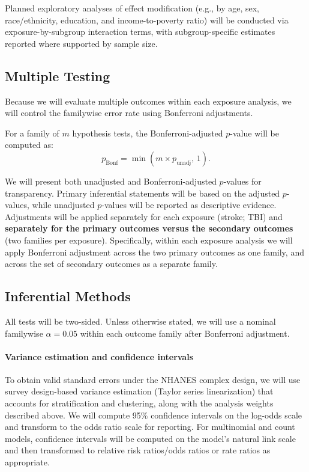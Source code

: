 \documentclass{article}
\begin{document}
Planned exploratory analyses of effect modification (e.g., by age, sex, race/ethnicity, education, and income-to-poverty ratio) will be conducted via exposure-by-subgroup interaction terms, with subgroup-specific estimates reported where supported by sample size.

\subsection{Multiple Testing}

Because we will evaluate multiple outcomes within each exposure analysis, we will control the familywise error rate using Bonferroni adjustments.

For a family of $m$ hypothesis tests, the Bonferroni-adjusted $p$-value will be computed as:
\[
p_{\text{Bonf}} = \min(m \times p_{\text{unadj}},\,1).
\]

We will present both unadjusted and Bonferroni-adjusted $p$-values for transparency. Primary inferential statements will be based on the adjusted $p$-values, while unadjusted $p$-values will be reported as descriptive evidence. Adjustments will be applied separately for each exposure (stroke; TBI) and \textbf{separately for the primary outcomes versus the secondary outcomes} (two families per exposure). Specifically, within each exposure analysis we will apply Bonferroni adjustment across the two primary outcomes as one family, and across the set of secondary outcomes as a separate family.

\subsection{Inferential Methods}

All tests will be two-sided. Unless otherwise stated, we will use a nominal familywise $\alpha = 0.05$ within each outcome family after Bonferroni adjustment.

\paragraph{Variance estimation and confidence intervals}

To obtain valid standard errors under the NHANES complex design, we will use survey design-based variance estimation (Taylor series linearization) that accounts for stratification and clustering, along with the analysis weights described above. We will compute 95\% confidence intervals on the log-odds scale and transform to the odds ratio scale for reporting. For multinomial and count models, confidence intervals will be computed on the model's natural link scale and then transformed to relative risk ratios/odds ratios or rate ratios as appropriate.
\end{document}
